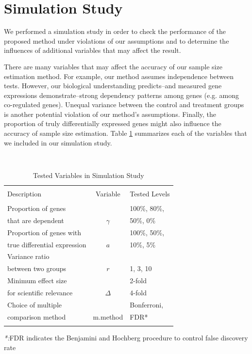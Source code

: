 \documentclass{bioinfo}
\begin{document}
\section{Simulation Study}

We performed a simulation study in order to check the performance of
the proposed method under violations of our assumptions and to
determine the influences of additional variables that may affect the
result.

There are many variables that may affect the accuracy of our
sample size estimation method. For example, our method assumes
independence between tests. However, our biological understanding
predicts--and measured gene expressions demonstrate--strong
dependency patterns among genes (e.g. among co-regulated genes).
Unequal variance between the control and treatment groups is
another potential violation of our method's assumptions. Finally,
the proportion of truly differentially expressed genes might also
influence the accuracy of sample size estimation.  Table
\ref{tb:SimuVariables} summarizes each of the variables that we
included in our simulation study.

\begin{table}\centering
  \caption{Tested Variables in Simulation Study}\ \\
  \begin{tabular}{lcl}
    \hline\hline
    \\
    Description & Variable & Tested Levels \\
    \\
    \hline\hline
    Proportion of genes &          & 100\%, 80\%,  \\
    that are dependent  & $\gamma$ & 50\%,   0\%    \\
    \hline
    Proportion of genes with     &     &  100\%, 50\%,\\
    true differential expression & $a$ &   10\%,  5\% \\
    \hline
    Variance ratio &  &\\
    between two groups & $r$ & 1, 3, 10  \\
    \hline
    Minimum effect size  & &2-fold \\
    for scientific relevance & $\Delta$ & 4-fold \\
    \hline
    Choice of multiple  & & Bonferroni,  \\
    comparison method & m.method & FDR* \\
    \hline\hline\\
  \end{tabular}
  \emph{*:}FDR indicates the Benjamini and Hochberg procedure to
    control false discovery rate
  \label{tb:SimuVariables}
\end{table}
\end{document}
